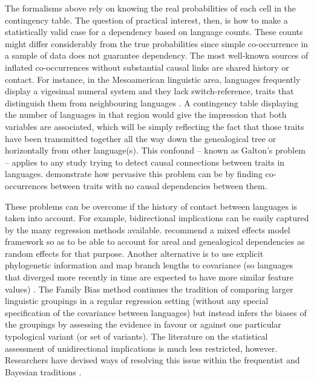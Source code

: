 \documentclass[output=paper]{langsci/langscibook}
\begin{document}
The formalisms above rely on knowing the real probabilities of each cell in the contingency table.  The question of practical interest, then, is how to make a statistically valid case for a dependency based on language counts.  These counts might differ considerably from the true probabilities since simple co-occurrence in a sample of data does not guarantee dependency. The most well-known sources of inflated co-occurrences without substantial causal links are shared history or contact.  For instance, in the Mesoamerican linguistic area,  languages frequently display a vigesimal numeral system and they lack switch-reference, traits that distinguish them from neighbouring languages \citep{campbell1986meso}. A contingency table displaying the number of languages in that region would give the impression that both variables are associated, which will be simply reflecting the fact that those traits have been transmitted  together all the way down the genealogical tree or horizontally   from other language(s). This confound -- known as Galton's problem -- applies to any study trying to detect causal connections between traits in languages.  \cite{roberts2013linguistic} demonstrate how pervasive this problem can be by finding co-occurrences between traits with no causal dependencies between them.  

   These problems can be overcome if the history of contact between languages is taken into account.  For example, bidirectional implications can be easily captured by the many regression methods available. \citet{jaeger2011mixed} recommend a mixed effects model framework so as to be able to account for areal and genealogical dependencies as random effects for that purpose. Another alternative is to use explicit phylogenetic  information and map branch lengths to covariance (so languages that diverged more recently in time are expected to have more similar feature values) \citep{Verkerk2014}. The Family Bias method  \citep{bickel2013distributional} continues the tradition of comparing larger linguistic groupings in a regular regression setting (without any special specification of the covariance between languages) but instead infers the biases of the groupings by assessing the evidence in favour or against one particular typological variant (or set of variants). 
The literature on the statistical assessment of unidirectional implications is much less restricted, however. Researchers have devised ways of resolving this issue within the frequentist \citep{Everett2015} and Bayesian traditions \citep{daumecampbell2009}.
\end{document}

